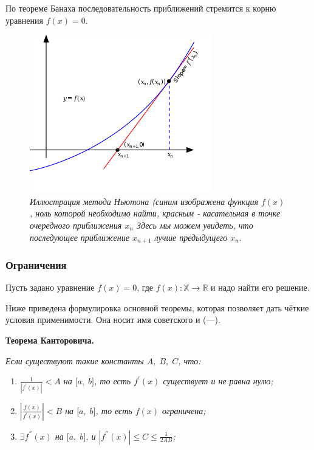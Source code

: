 \documentclass[a4paper]{article}
\begin{document}
{{{{{{{{По теореме Банаха последовательность приближений стремится к корню уравнения {\(f(x) = 0\)}.

\begin{figure}[h]
 \begin{center}
  \includegraphics[width=3.125in,height=2.70833in]{images/Newton_iteration.png}
 \end{center}
  \caption{\textit{Иллюстрация метода Ньютона (синим изображена функция {\(f(x)\)},
    ноль которой необходимо найти, красным - касательная в точке
    очередного приближения {\(x_{n}\)}
    Здесь мы можем увидеть, что последующее приближение {\(x_{n + 1}\)}
    лучше предыдущего {\(x_{n}\)}.}}
\end{figure}


\subsubsection{Ограничения}

Пусть задано уравнение {{\(f(x) = 0\)}}, где
{{\(f(x):\mathbb{X}\rightarrow\mathbb{R}\)}} и надо найти его решение.

Ниже приведена формулировка основной теоремы, которая позволяет дать
чёткие условия применимости. Она носит имя советского и (---).

\textbf{Теорема Канторовича.}

\emph{Если существуют такие константы {{\(A,\; B,\; C\)}}, что:}

\begin{enumerate}
\item
  \emph{{{\(\frac{1}{|f^{\prime}(x)|} < A\)}} на
  {{\(\lbrack a,\; b\rbrack\)}}, то есть {{\(f^{\prime}(x)\)}}
  существует и не равна нулю;}
\item
  \emph{{{\(\left| \frac{f(x)}{f^{\prime}(x)} \right| < B\)}} на
  {{\(\lbrack a,\; b\rbrack\)}}, то есть {{\(f(x)\)}} ограничена;}
\item
  \emph{{{\(\exists f^{''}(x)\)}} на {{\(\lbrack a,\; b\rbrack\)}}, и
  {{\(|f^{''}(x)| \leqslant C \leqslant \frac{1}{2AB}\)}};}
\end{enumerate}

}}}}}}}}
\end{document}
